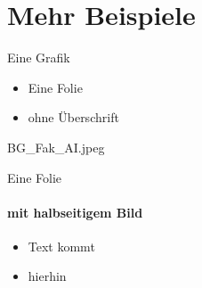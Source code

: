 \documentclass[t,
aspectratio=169,  %
]{beamer}
\begin{document}
\section{Mehr Beispiele}

\begin{frame}{Eine Grafik}
	\begin{center}
	\end{center}
\end{frame}

\begin{frame}{}
	\begin{itemize}
		\item Eine Folie
		\item ohne Überschrift
	\end{itemize}
\end{frame}

\begin{halfpage}{BG_Fak_AI.jpeg} %
\begin{frame}{Eine Folie}
	\framesubtitle{mit halbseitigem Bild}
	\begin{itemize}
		\item Text kommt
		\item hierhin
	\end{itemize}
\end{frame}
\end{halfpage}
\end{document}
